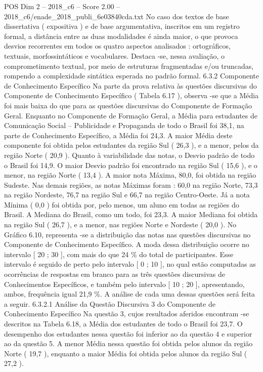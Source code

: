 \begin{textsample}{POS Dim 2 – 2018\_c6 – Score 2.00 – 2018\_c6/enade\_2018\_publi\_6e03840cda.txt}
No caso dos textos de base dissertativa ( expositiva ) e de base argumentativa, inscritos em um registro formal, a distância entre as duas modalidades é ainda maior, o que provoca desvios recorrentes em todos os quatro aspectos analisados : ortográficos, textuais, morfossintáticos e vocabulares.
Destaca -se, nessa avaliação, o comprometimento textual, por meio de estruturas fragmentadas e/ou truncadas, rompendo a complexidade sintática esperada no padrão formal. 6.3.2 Componente de Conhecimento Específico Na parte da prova relativa às questões discursivas do Componente de Conhecimento Específico ( Tabela 6.17 ), observa -se que a Média foi mais baixa do que para as questões discursivas do Componente de Formação Geral.
Enquanto no Componente de Formação Geral, a Média para estudantes de Comunicação Social – Publicidade e Propaganda de todo o Brasil foi 38,1, na parte de Conhecimento Específico, a Média foi 24,3.
A maior Média deste componente foi obtida pelos estudantes da região Sul ( 26,3 ), e a menor, pelos da região Norte ( 20,9 ).
Quanto à variabilidade das notas, o Desvio padrão de todo o Brasil foi 14,9.
O maior Desvio padrão foi encontrado na região Sul ( 15,6 ), e o menor, na região Norte ( 13,4 ).
A maior nota Máxima, 80,0, foi obtida na região Sudeste.
Nas demais regiões, as notas Máximas foram : 60,0 na região Norte, 73,3 na região Nordeste, 76,7 na região Sul e 66,7 na região Centro-Oeste.
Já a nota Mínima ( 0,0 ) foi obtida por, pelo menos, um aluno em todas as regiões do Brasil.
A Mediana do Brasil, como um todo, foi 23,3.
A maior Mediana foi obtida na região Sul ( 26,7 ), e a menor, nas regiões Norte e Nordeste ( 20,0 ).
No Gráfico 6.10, representa -se a distribuição das notas nas questões discursivas no Componente de Conhecimento Específico.
A moda dessa distribuição ocorre no intervalo [ 20 ; 30 ], com mais do que 24 \% do total de participantes.
Esse intervalo é seguido de perto pelo intervalo [ 0 ; 10 ], no qual estão computadas as ocorrências de respostas em branco para as três questões discursivas de Conhecimentos Específicos, e também pelo intervalo [ 10 ; 20 ], apresentando, ambos, frequência igual 21,9 \%.
A análise de cada uma dessas questões será feita a seguir. 6.3.2.1 Análise da Questão Discursiva 3 do Componente de Conhecimento Específico Na questão 3, cujos resultados aferidos encontram -se descritos na Tabela 6.18, a Média dos estudantes de todo o Brasil foi 23,7.
O desempenho dos estudantes nessa questão foi inferior ao da questão 4 e superior ao da questão 5.
A menor Média nessa questão foi obtida pelos alunos da região Norte ( 19,7 ), enquanto a maior Média foi obtida pelos alunos da região Sul ( 27,2 ).

\end{textsample}

